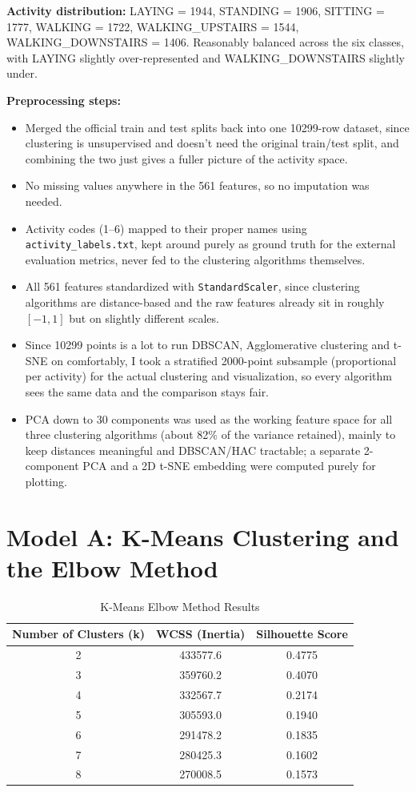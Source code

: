 \documentclass[12pt,a4paper]{article}
\begin{document}
\textbf{Activity distribution:} LAYING = 1944, STANDING = 1906, SITTING = 1777, WALKING = 1722,
WALKING\_UPSTAIRS = 1544, WALKING\_DOWNSTAIRS = 1406. Reasonably balanced across the six classes, with
LAYING slightly over-represented and WALKING\_DOWNSTAIRS slightly under.

\textbf{Preprocessing steps:}
\begin{itemize}
\item Merged the official train and test splits back into one 10299-row dataset, since clustering is
unsupervised and doesn't need the original train/test split, and combining the two just gives a fuller
picture of the activity space.
\item No missing values anywhere in the 561 features, so no imputation was needed.
\item Activity codes (1--6) mapped to their proper names using \texttt{activity\_labels.txt}, kept
around purely as ground truth for the external evaluation metrics, never fed to the clustering
algorithms themselves.
\item All 561 features standardized with \texttt{StandardScaler}, since clustering algorithms are
distance-based and the raw features already sit in roughly $[-1, 1]$ but on slightly different scales.
\item Since 10299 points is a lot to run DBSCAN, Agglomerative clustering and t-SNE on comfortably, I
took a stratified 2000-point subsample (proportional per activity) for the actual clustering and
visualization, so every algorithm sees the same data and the comparison stays fair.
\item PCA down to 30 components was used as the working feature space for all three clustering
algorithms (about 82\% of the variance retained), mainly to keep distances meaningful and DBSCAN/HAC
tractable; a separate 2-component PCA and a 2D t-SNE embedding were computed purely for plotting.
\end{itemize}

\section{Model A: K-Means Clustering and the Elbow Method}

\begin{table}[H]
\centering
\caption{K-Means Elbow Method Results}
\begin{tabular}{ccc}
\toprule
Number of Clusters (k) & WCSS (Inertia) & Silhouette Score \\
\midrule
2 & 433577.6 & 0.4775 \\
3 & 359760.2 & 0.4070 \\
4 & 332567.7 & 0.2174 \\
5 & 305593.0 & 0.1940 \\
6 & 291478.2 & 0.1835 \\
7 & 280425.3 & 0.1602 \\
8 & 270008.5 & 0.1573 \\
\bottomrule
\end{tabular}
\end{table}
\end{document}
